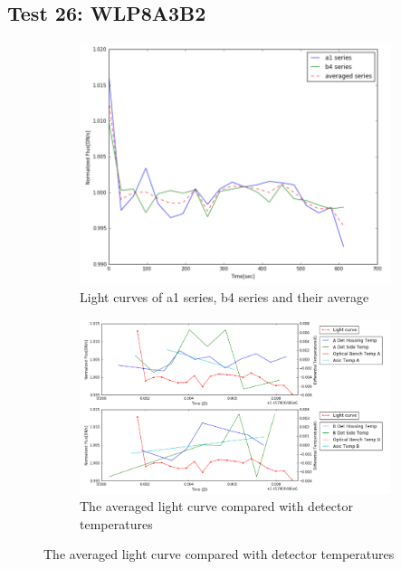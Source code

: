 \documentclass[conference]{IEEEtran}
\begin{document}
\subsection{Test 26: WLP8A3B2} 
\begin{figure}[H]
    \centering
    \begin{subfigure}{1}
        \includegraphics[scale=0.4]{ts_test26}
        \caption{Light curves of a1 series, b4 series and their average}
    \end{subfigure}

    \begin{subfigure}{2}
        \includegraphics[scale=0.4]{temp_test26}
        \caption{The averaged light curve compared with detector temperatures}
    \end{subfigure}
   

\end{figure}
\end{document}
